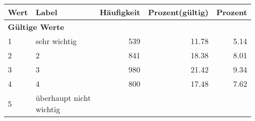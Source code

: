      \begin{longtable}{lXrrr}
     \toprule
     \textbf{Wert} & \textbf{Label} & \textbf{Häufigkeit} & \textbf{Prozent(gültig)} & \textbf{Prozent} \\
     \endhead
     \midrule
     \multicolumn{5}{l}{\textbf{Gültige Werte}}\\

     1 &
     \multicolumn{1}{X}{ sehr wichtig   } &


       \num{539} &
       \num[round-mode=places,round-precision=2]{11,78} &
         \num[round-mode=places,round-precision=2]{5,14} \\

     2 &
     \multicolumn{1}{X}{ 2   } &


       \num{841} &
       \num[round-mode=places,round-precision=2]{18,38} &
         \num[round-mode=places,round-precision=2]{8,01} \\

     3 &
     \multicolumn{1}{X}{ 3   } &


       \num{980} &
       \num[round-mode=places,round-precision=2]{21,42} &
         \num[round-mode=places,round-precision=2]{9,34} \\

     4 &
     \multicolumn{1}{X}{ 4   } &


       \num{800} &
       \num[round-mode=places,round-precision=2]{17,48} &
         \num[round-mode=places,round-precision=2]{7,62} \\

     5 &
     \multicolumn{1}{X}{ überhaupt nicht wichtig   } &



\end{longtable}
